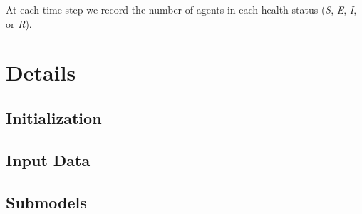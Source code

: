 \documentclass[nofonts,]{tufte-handout}
\begin{document}
At each time step we record the number of agents in each health status
(\emph{S}, \emph{E}, \emph{I}, or \emph{R}).

\hypertarget{details}{%
\section{Details}\label{details}}

\hypertarget{initialization}{%
\subsection{Initialization}\label{initialization}}

\hypertarget{input-data}{%
\subsection{Input Data}\label{input-data}}

\hypertarget{submodels}{%
\subsection{Submodels}\label{submodels}}

\renewcommand\refname{References}

\end{document}
